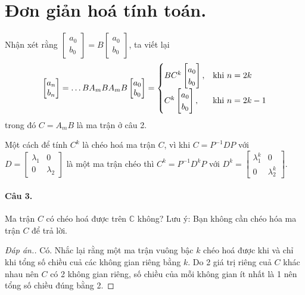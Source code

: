 \documentclass[11pt]{article}
\begin{document}
\section*{Đơn giản hoá tính toán.}
\label{sec:org59250a0}
Nhận xét rằng \(\begin{bmatrix} a_0\\b_0 \end{bmatrix} = B\begin{bmatrix} a_0\\b_0
\end{bmatrix}\), ta viết lại
\[
 \begin{bmatrix} a_n\\b_n \end{bmatrix} = \dots B A_m B A_m B \begin{bmatrix} a_0\\b_0
\end{bmatrix} = \begin{cases}
B C^k	\begin{bmatrix} a_0\\b_0
\end{bmatrix}	,  & \text{khi $ n = 2k$} \\
C^k \begin{bmatrix} a_0\\b_0
\end{bmatrix}		, & \text{khi $n = 2k - 1$}
		\end{cases}
\]
trong đó \(C = A_m B\) là ma trận ở câu 2.

Một cách để tính \(C^k\) là chéo hoá ma trận \(C\), vì khi \(C = P^{-1} D P\) với \(D = \begin{bmatrix} \lambda_1 & 0\\ 0 &
\lambda_2 \end{bmatrix}\) là một ma trận chéo thì \(C^k = P^{-1}D^k P\) với \(D^k = \begin{bmatrix} \lambda_1^k & 0\\ 0 &
\lambda_2^k \end{bmatrix}\).

\paragraph{Câu 3.}
\label{sec:org7c9b1d6}
Ma trận \(C\) có chéo hoá được trên \(\mathbb{C}\) không? Lưu ý: Bạn không cần chéo hóa ma trận
\(C\) để trả lời.
\begin{proof}[Đáp án.]
Có. Nhắc lại rằng một ma trận vuông bậc \(k\) chéo hoá được khi và chỉ khi tổng số chiều
cuả các không gian riêng bằng \(k\). Do 2 giá trị riêng cuả \(C\) khác nhau nên \(C\) có 2 không gian riêng, số chiều của mỗi
không gian ít nhất là 1 nên tổng số chiều đúng bằng 2.
\end{proof}
\end{document}
